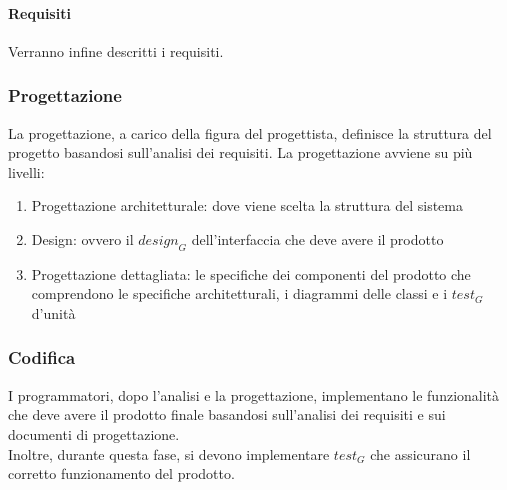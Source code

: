 \paragraph{Requisiti} 
Verranno infine descritti i requisiti.
\subsubsection{Progettazione}
La progettazione, a carico della figura del progettista, definisce la struttura del progetto basandosi sull'analisi dei requisiti.
La progettazione avviene su più livelli:
\begin{enumerate}
    \item Progettazione architetturale: dove viene scelta la struttura del sistema
    \item Design: ovvero il $\textit{design}_G$ dell'interfaccia che deve avere il prodotto
    \item Progettazione dettagliata: le specifiche dei componenti del prodotto che comprendono le specifiche architetturali, i diagrammi delle classi e i $\textit{test}_G$ d'unità
\end{enumerate}
\subsubsection{Codifica}
I programmatori, dopo l'analisi e la progettazione, implementano le funzionalità che deve avere il prodotto finale basandosi sull'analisi dei requisiti e sui documenti di progettazione.\\
Inoltre, durante questa fase, si devono implementare $\textit{test}_G$ che assicurano il corretto funzionamento del prodotto.